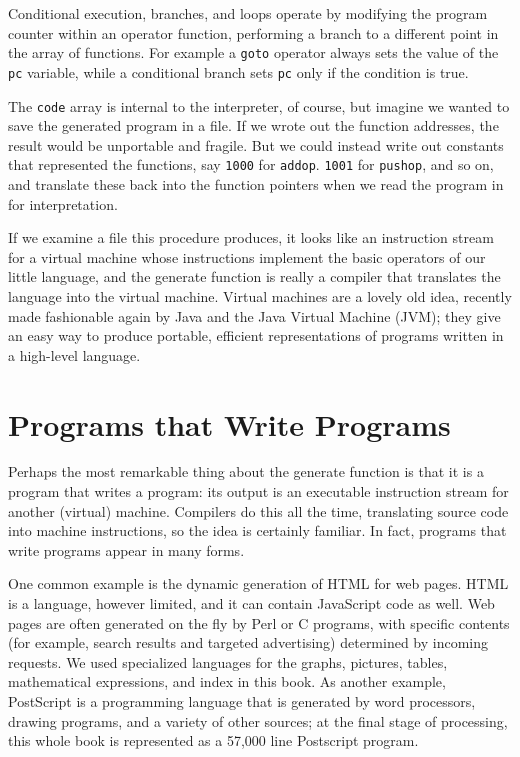 Conditional execution, branches, and loops operate by modifying the program
counter within an operator function, performing a branch to a different
point in the array of functions. For example a \verb'goto' operator always
sets the value of the \verb'pc' variable, while a conditional branch sets
\verb'pc' only if the condition is true.

The \verb'code' array is internal to the interpreter, of course, but
imagine we wanted to save the generated program in a file. If we wrote out
the function addresses, the result would be unportable and fragile. But we
could instead write out constants that represented the functions, say
\verb'1000' for \verb'addop'.  \verb'1001' for \verb'pushop', and so on,
and translate these back into the function pointers when we read the
program in for interpretation.

If we examine a file this procedure produces, it looks like an instruction
stream for a virtual machine whose instructions implement the basic
operators of our little language, and the generate function is really a
compiler that translates the language into the virtual machine. Virtual
machines are a lovely old idea, recently made fashionable again by Java and
the Java Virtual Machine (JVM); they give an easy way to produce portable,
efficient representations of programs written in a high-level language.

\section{Programs that Write Programs}
\label{sec:programs_that_write_programs}

Perhaps the most remarkable thing about the generate function is that it is
a program that writes a program: its output is an executable instruction
stream for another (virtual) machine. Compilers do this all the time,
translating source code into machine instructions, so the idea is certainly
familiar. In fact, programs that write programs appear in many forms.

One common example is the dynamic generation of HTML for web pages. HTML is
a language, however limited, and it can contain JavaScript code as well.
Web pages are often generated on the fly by Perl or C programs, with
specific contents (for example, search results and targeted advertising)
determined by incoming requests. We used specialized languages for the
graphs, pictures, tables, mathematical expressions, and index in this book.
As another example, PostScript is a programming language that is generated
by word processors, drawing programs, and a variety of other sources; at
the final stage of processing, this whole book is represented as a 57,000
line Postscript program.

